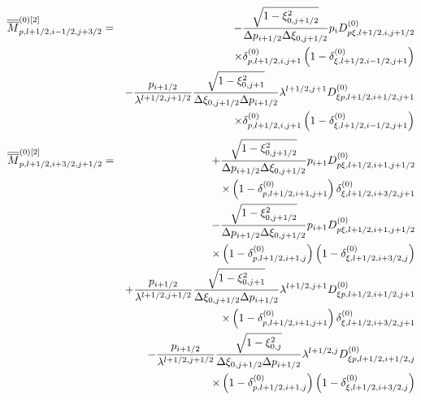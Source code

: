 \begin{eqnarray}
\overline{\overline{M}}_{p,l+1/2,i-1/2,j+3/2}^{\left( 0\right) \left[ 2%
\right] } &=&-\frac{\sqrt{1-\xi _{0,j+1/2}^{2}}}{\Delta p_{i+1/2}\Delta \xi
_{0,j+1/2}}p_{i}D_{p\xi ,l+1/2,i,j+1/2}^{\left( 0\right) }  \notag \\
&&\times \delta _{p,l+1/2,i,j+1}^{\left( 0\right) }\left( 1-\delta _{\xi
,l+1/2,i-1/2,j+1}^{\left( 0\right) }\right)   \notag \\
&&-\frac{p_{i+1/2}}{\lambda ^{l+1/2,j+1/2}}\frac{\sqrt{1-\xi _{0,j+1}^{2}}}{%
\Delta \xi _{0,j+1/2}\Delta p_{i+1/2}}\lambda ^{l+1/2,j+1}D_{\xi
p,l+1/2,i+1/2,j+1}^{\left( 0\right) }  \notag \\
&&\times \delta _{p,l+1/2,i,j+1}^{\left( 0\right) }\left( 1-\delta _{\xi
,l+1/2,i-1/2,j+1}^{\left( 0\right) }\right) 
\end{eqnarray}%
\begin{eqnarray}
\overline{\overline{M}}_{p,l+1/2,i+3/2,j+1/2}^{\left( 0\right) \left[ 2%
\right] } &=&+\frac{\sqrt{1-\xi _{0,j+1/2}^{2}}}{\Delta p_{i+1/2}\Delta \xi
_{0,j+1/2}}p_{i+1}D_{p\xi ,l+1/2,i+1,j+1/2}^{\left( 0\right) }  \notag \\
&&\times \left( 1-\delta _{p,l+1/2,i+1,j+1}^{\left( 0\right) }\right) \delta
_{\xi ,l+1/2,i+3/2,j+1}^{\left( 0\right) }  \notag \\
&&-\frac{\sqrt{1-\xi _{0,j+1/2}^{2}}}{\Delta p_{i+1/2}\Delta \xi _{0,j+1/2}}%
p_{i+1}D_{p\xi ,l+1/2,i+1,j+1/2}^{\left( 0\right) }  \notag \\
&&\times \left( 1-\delta _{p,l+1/2,i+1,j}^{\left( 0\right) }\right) \left(
1-\delta _{\xi ,l+1/2,i+3/2,j}^{\left( 0\right) }\right)   \notag \\
&&+\frac{p_{i+1/2}}{\lambda ^{l+1/2,j+1/2}}\frac{\sqrt{1-\xi _{0,j+1}^{2}}}{%
\Delta \xi _{0,j+1/2}\Delta p_{i+1/2}}\lambda ^{l+1/2,j+1}D_{\xi
p,l+1/2,i+1/2,j+1}^{\left( 0\right) }  \notag \\
&&\times \left( 1-\delta _{p,l+1/2,i+1,j+1}^{\left( 0\right) }\right) \delta
_{\xi ,l+1/2,i+3/2,j+1}^{\left( 0\right) }  \notag \\
&&-\frac{p_{i+1/2}}{\lambda ^{l+1/2,j+1/2}}\frac{\sqrt{1-\xi _{0,j}^{2}}}{%
\Delta \xi _{0,j+1/2}\Delta p_{i+1/2}}\lambda ^{l+1/2,j}D_{\xi
p,l+1/2,i+1/2,j}^{\left( 0\right) }  \notag \\
&&\times \left( 1-\delta _{p,l+1/2,i+1,j}^{\left( 0\right) }\right) \left(
1-\delta _{\xi ,l+1/2,i+3/2,j}^{\left( 0\right) }\right) 
\end{eqnarray}%
